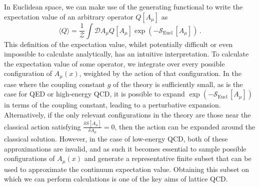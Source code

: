 In Euclidean space, we can make use of the generating functional to write the expectation value of an arbitrary operator $Q[A_\mu]$ as~\cite{Luscher:1984xn}
%
\begin{equation}
\langle Q \rangle = \frac{1}{\mathcal{Z}}\int \mathcal{D} A_\mu Q[A_\mu] \exp\left(-\mathcal{S}_{\text{Eucl}}\,[A_\mu]\right)\, .
\end{equation}
%
This definition of the expectation value, whilst potentially difficult or even impossible to calculate analytically, has an intuitive interpretation. To calculate the expectation value of some operator, we integrate over every possible configuration of $A_\mu(x)$, weighted by the action of that configuration. In the case where the coupling constant $g$ of the theory is sufficiently small, as is the case for QED or high-energy QCD, it is possible to expand $\exp\left(-\mathcal{S}_{\text{Eucl}}\,[A_\mu]\right)$ in terms of the coupling constant, leading to a perturbative expansion. Alternatively, if the only relevant configurations in the theory are those near the classical action satisfying $\frac{\delta S[A_\mu]}{\delta A_\mu}=0$, then the action can be expanded around the classical solution. However, in the case of low-energy QCD, both of these approximations are invalid, and as such it becomes essential to sample possible configurations of $A_\mu(x)$ and generate a representative finite subset that can be used to approximate the continuum expectation value. Obtaining this subset on which we can perform calculations is one of the key aims of lattice QCD.

